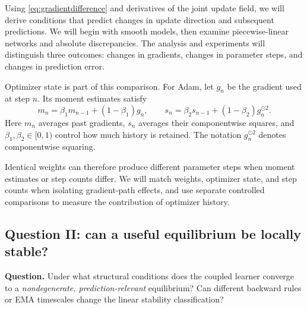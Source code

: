 \documentclass[11pt,a4paper]{article}
\begin{document}
Using \eqref{eq:gradientdifference} and derivatives of the joint update field, we will derive conditions that predict changes in update direction and subsequent predictions. We will begin with smooth models, then examine piecewise-linear networks and absolute discrepancies. The analysis and experiments will distinguish three outcomes: changes in gradients, changes in parameter steps, and changes in prediction error.

Optimizer state is part of this comparison. For Adam, let $g_n$ be the gradient used at step $n$. Its moment estimates satisfy
\begin{equation}
m_n=\beta_1m_{n-1}+(1-\beta_1)g_n,\qquad
s_n=\beta_2s_{n-1}+(1-\beta_2)g_n^{\odot2}.
\label{eq:adam}
\end{equation}
Here $m_n$ averages past gradients, $s_n$ averages their componentwise squares, and $\beta_1,\beta_2\in[0,1)$ control how much history is retained. The notation $g_n^{\odot2}$ denotes componentwise squaring.

Identical weights can therefore produce different parameter steps when moment estimates or step counts differ. We will match weights, optimizer state, and step counts when isolating gradient-path effects, and use separate controlled comparisons to measure the contribution of optimizer history.

\subsection{Question II: can a useful equilibrium be locally stable?}
\textbf{Question.} Under what structural conditions does the coupled learner converge to a \emph{nondegenerate, prediction-relevant} equilibrium? Can different backward rules or EMA timescales change the linear stability classification?
\end{document}
